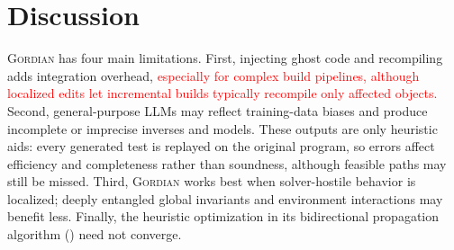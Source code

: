 \documentclass[acmsmall]{acmart}
\newcommand{\rev}[1]{\textcolor{red}{#1}}
\newcommand{\rev}[1]{#1}
\newcommand{\projName}{\textsc{Gordian}\xspace}
\theoremstyle{definition}
\begin{document}




\section{Discussion}

\projName{} has four main limitations. First, injecting ghost code and recompiling adds integration overhead, \rev{especially for complex build pipelines, although localized edits let incremental builds typically recompile only affected objects.} Second, general-purpose LLMs may reflect training-data biases and produce incomplete or imprecise inverses and models. These outputs are only heuristic aids: every generated test is replayed on the original program, so errors affect efficiency and completeness rather than soundness, although feasible paths may still be missed. Third, \projName{} works best when solver-hostile behavior is localized; deeply entangled global invariants and environment interactions may benefit less. Finally, the heuristic optimization in its bidirectional propagation algorithm () need not converge.
\end{document}
